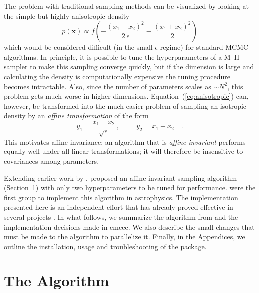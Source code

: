 \documentclass[12pt,preprint]{aastex}
\newcommand{\project}[1]{{\sffamily #1}}
\newcommand{\thisplain}{emcee}
\newcommand{\this}{\project{\thisplain}}
\newcommand{\Eq}[1]{Equation~(\ref{eq:#1})}
\newcommand{\eqlabel}[1]{\label{eq:#1}}
\newcommand{\Sect}[1]{Section~\ref{sect:#1}}
\newcommand{\sect}[1]{\Sect{#1}}
\newcommand{\sectlabel}[1]{\label{sect:#1}}
\begin{document}
The problem with traditional sampling methods can be visualized by looking
at the simple but highly anisotropic density
\begin{equation}
    \eqlabel{anisotropic}
    p(\mathbf{x}) \propto f \left (-\frac{(x_1-x_2)^2}{2\,\epsilon}
                                        - \frac{(x_1+x_2)^2}{2} \right )
\end{equation}
which would be considered difficult (in the small-$\epsilon$ regime) for
standard MCMC algorithms. In principle, it is possible to tune the
hyperparameters of a M--H sampler to make this sampling converge quickly,
but if the dimension is large and calculating the density
is computationally expensive the tuning procedure becomes intractable.
Also, since the number of parameters scales as $\sim N^2$, this problem gets
much worse in higher dimensions.
\Eq{anisotropic} can, however, be transformed into the much easier problem of
sampling an isotropic density by an \emph{affine transformation} of the form
\begin{equation}
    y_1 = \frac{x_1-x_2}{\sqrt{\epsilon}} \, ,
        \hspace{1cm} y_2 = x_1 + x_2 \quad .
\end{equation}
This motivates affine invariance: an algorithm that is \emph{affine invariant}
performs equally well under all linear transformations; it will therefore be
insensitive to
covariances among parameters.

Extending earlier work by \citet{Christen:2007},
\citet[][hereafter ]{Goodman:2010} proposed an
affine invariant sampling
algorithm (\sect{algo}) with only two hyperparameters to be tuned for
performance. \citet{Hou:2011} were the first group to implement this
algorithm in astrophysics. The implementation presented here is
an independent effort that has already proved effective in several projects
\citep{sanders2013,reis2013,weisz2013,cieza2013,akeret2012,huppenkothen2012,
monnier2012,morton2012,crossfield2012,roskar2012,bovy2012b,brown2012,
brammer2012,bussmann2012,bovy2012a,lang2012,bovy2012,olofsson2012,dorman2012}.
In what follows, we summarize the
algorithm from  and the implementation
decisions made in \this. We also describe the small changes
that must be made to the algorithm to parallelize it. Finally, in the
Appendices, we outline the installation, usage and troubleshooting of
the package.

\section{The Algorithm}\sectlabel{algo}
\end{document}
